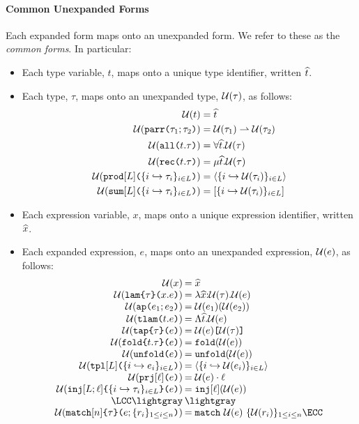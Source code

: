 \paragraph{Common Unexpanded Forms} Each expanded form maps onto an unexpanded form. We refer to these as the \emph{common forms}. In particular:
\begin{itemize}
\item Each type variable, $t$, maps onto a unique {type identifier}, written $\widehat{t}$.
\item Each type, $\tau$, maps onto an unexpanded type, $\mathcal{U}(\tau)$, as follows: 
  \begin{align*}
  \mathcal{U}(t) &= \widehat{t}\\
  \mathcal{U}(\texttt{parr}\texttt{(}\tau_1; \tau_2\texttt{)}) & = \mathcal{U}(\tau_1) \rightharpoonup \mathcal{U}(\tau_2)\\
  \mathcal{U}(\texttt{all}\texttt{(}t.\tau\texttt{)}) & = \forall \widehat{t}.\mathcal{U}(\tau)\\
  \mathcal{U}(\texttt{rec}\texttt{(}t.\tau\texttt{)}) & = \mu \widehat{t}.\mathcal{U}(\tau)\\
  \mathcal{U}(\texttt{prod}[L]\texttt{(}\{i \hookrightarrow \tau_{i}\}_{i \in L}\texttt{)}) & = \langle \{i \hookrightarrow \mathcal{U}(\tau_{i})\}_{i \in L} \rangle\\
  \mathcal{U}(\texttt{sum}[L]\texttt{(}\{i \hookrightarrow \tau_{i}\}_{i \in L}\texttt{)}) & = [\{i \hookrightarrow \mathcal{U}(\tau_{i})\}_{i \in L}]
  \end{align*}
\item Each expression variable, $x$, maps onto a unique expression identifier, written $\widehat{x}$.
\item Each expanded expression, $e$, maps onto an unexpanded expression, $\mathcal{U}(e)$, as follows:
\[\arraycolsep=1pt\begin{array}{rl}
\Uof{x} & = \sigilof{x}\\
\Uof{\aelam{\tau}{x}{e}} & = \lam{\sigilof{x}}{\Uof{\tau}}{\Uof{e}}\\
\Uof{\aeap{e_1}{e_2}} & = \ap{\Uof{e_1}}{\Uof{e_2}}\\
\Uof{\aetlam{t}{e}} & = \Lam{\sigilof{t}}{\Uof{e}}\\
\Uof{\aetap{e}{\tau}} & = \App{\Uof{e}}{\Uof{\tau}}\\
\Uof{\aefold{t}{\tau}{e}} & = \fold{\Uof e}\\
\Uof{\aeunfold{e}} & = \unfold{\Uof{e}}\\
\Uof{\aetpl{\labelset}{\mapschema{e}{i}{\labelset}}} & = \tpl{\mapschemax{\Uofv}{e}{i}{\labelset}}\\
\Uof{\aepr{\ell}{e}} & = \prj{\Uof{e}}{\ell}\\
\Uof{\aein{\labelset}{\ell}{\mapschema{\tau}{i}{\labelset}}{e}} &= \inj{\ell}{\Uof{e}}\\
\LCC \lightgray & \lightgray \\
\Uof{\aematchwith{n}{\tau}{e}{\seqschemaX{r}}} & = \matchwith{\Uof{e}}{\seqschemaXx{\Uofv}{r}}\ECC
\end{array}\]
\end{itemize}
